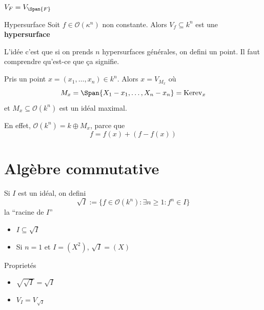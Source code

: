 \begin{proposition}{}
    \(V_F = V_{\Span{F} } \) 
\end{proposition}

\begin{definition}{Hypersurface}
    Soit \(f \in \mathcal{O}{(\kappa^{n})}\) non constante. Alors \(V_f
    \subseteq k^{n} \) est une \textbf{hypersurface}
\end{definition}

L'idée c'est que si on prends \(n\) hypersurfaces générales, on defini un point.
Il faut comprendre qu'est-ce que ça signifie.

\begin{definition}{}
    Pris un point \(x = {(x_{1}, \dots, x_{n})} \in k^{n}\). Alors \(x = V_{M_x}
    \) où 
    \[
      M_x = \Span{X_{1} - x_{1}, \dots, X_{n} - x_{n}} =
      \mathrm{Ker}\mathrm{ev}_x
    \]
    et \(M_x \subseteq \mathcal{O}{(k^{n})} \) est un idéal maximal.

\end{definition}
\begin{remark}{}
    En effet, \(\mathcal{O}{(k^{n})} = k \oplus M_x\), parce que
    \[
      f = f{(x)} + {(f - f{(x)})}
    \]
\end{remark}

\section{Algèbre commutative}

\begin{definition}{}
    Si \(I\) est un idéal, on defini
    \[
      \sqrt{I} := \{f \in \mathcal{O}{(k^{n})}: \exists n \ge 1 : f^{n} \in I\} 
    \]
    la ``racine de \(I\)''
\end{definition}
\begin{example}{}
\begin{itemize} \(\) 
    \item \( I \subseteq \sqrt{I} \) 
    \item Si \(n = 1\) et \(I = {(X^2)}\), \(\sqrt{I} = {(X)}\) 
\end{itemize}
\end{example}

\begin{eser}{Proprietés}
\begin{itemize}
    \item \(\sqrt{\sqrt{I}} = \sqrt{I}\) 
    \item \(V_I = V_{\sqrt{I}}\) 
\end{itemize}
\end{eser}


